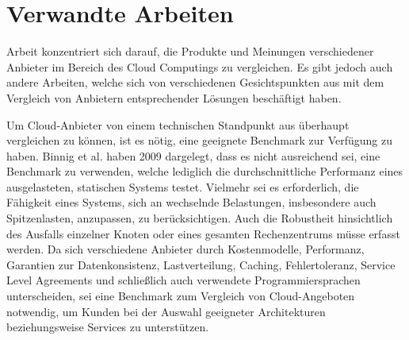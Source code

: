 \section{Verwandte Arbeiten}
\label{sec_related_work}

 Arbeit konzentriert sich darauf, die Produkte und Meinungen verschiedener Anbieter im Bereich des Cloud Computings zu vergleichen. 
Es gibt jedoch auch andere Arbeiten, welche sich von verschiedenen Gesichtspunkten aus mit dem Vergleich von Anbietern entsprechender Lösungen beschäftigt haben. 

%

Um Cloud-Anbieter von einem technischen Standpunkt aus überhaupt vergleichen zu können, ist es nötig, eine geeignete Benchmark zur Verfügung zu haben. 
Binnig et al.\cite{binnig2009} haben 2009 dargelegt, dass es nicht ausreichend sei, eine Benchmark zu verwenden, welche lediglich die durchschnittliche Performanz eines ausgelasteten, statischen Systems testet. 
Vielmehr sei es erforderlich, die Fähigkeit eines Systems, sich an wechselnde Belastungen, insbesondere auch Spitzenlasten, anzupassen, zu berücksichtigen. 
Auch die Robustheit hinsichtlich des Ausfalls einzelner Knoten oder eines gesamten Rechenzentrums müsse erfasst werden. 
Da sich verschiedene Anbieter durch Kostenmodelle, Performanz, Garantien zur Datenkonsistenz, Lastverteilung, Caching, Fehlertoleranz, Service Level Agreements und schließlich auch verwendete Programmiersprachen unterscheiden, sei eine Benchmark zum Vergleich von Cloud-Angeboten notwendig, um Kunden bei der Auswahl geeigneter Architekturen beziehungsweise Services zu unterstützen. 

